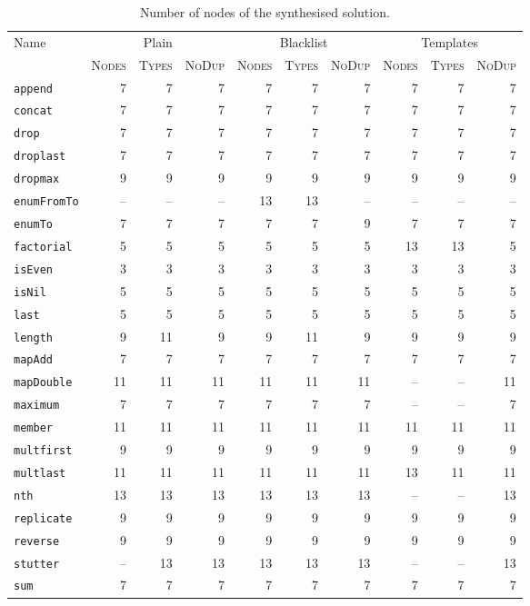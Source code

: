 {\footnotesize
\begin{longtable}{@{}lr@{\hspace{2pt}}r@{\hspace{2pt}}rr@{\hspace{2pt}}r@{\hspace{2pt}}rr@{\hspace{2pt}}r@{\hspace{2pt}}r@{}}
\caption{Number of nodes of the synthesised solution.\label{fig:nofnodestable}}\\
\toprule
Name & \multicolumn{3}{c}{\textsf{Plain}} & \multicolumn{3}{c}{\textsf{Blacklist}} & \multicolumn{3}{c}{\textsf{Templates}} \\
\cmidrule(lr){2-4} \cmidrule(lr){5-7} \cmidrule(l){8-10}
     & \textsc{Nodes} & \textsc{Types} & \textsc{NoDup} & \textsc{Nodes} & \textsc{Types} & \textsc{NoDup} & \textsc{Nodes} & \textsc{Types} & \textsc{NoDup} \\
\midrule
\verb|append| & 7 & 7 & 7 & 7 & 7 & 7 & 7 & 7 & 7 \\
\verb|concat| & 7 & 7 & 7 & 7 & 7 & 7 & 7 & 7 & 7 \\
\verb|drop| & 7 & 7 & 7 & 7 & 7 & 7 & 7 & 7 & 7 \\
\verb|droplast| & 7 & 7 & 7 & 7 & 7 & 7 & 7 & 7 & 7 \\
\verb|dropmax| & 9 & 9 & 9 & 9 & 9 & 9 & 9 & 9 & 9 \\
\verb|enumFromTo| & -- & -- & -- & 13 & 13 & -- & -- & -- & -- \\
\verb|enumTo| & 7 & 7 & 7 & 7 & 7 & 9 & 7 & 7 & 7 \\
\lstinline|factorial| & 5 & 5 & 5 & 5 & 5 & 5 & 13 & 13 & 5 \\
\lstinline|isEven| & 3 & 3 & 3 & 3 & 3 & 3 & 3 & 3 & 3 \\
\lstinline|isNil| & 5 & 5 & 5 & 5 & 5 & 5 & 5 & 5 & 5 \\
\lstinline|last| & 5 & 5 & 5 & 5 & 5 & 5 & 5 & 5 & 5 \\
\lstinline|length| & 9 & 11 & 9 & 9 & 11 & 9 & 9 & 9 & 9 \\
\lstinline|mapAdd| & 7 & 7 & 7 & 7 & 7 & 7 & 7 & 7 & 7 \\
\lstinline|mapDouble| & 11 & 11 & 11 & 11 & 11 & 11 & -- & -- & 11 \\
\lstinline|maximum| & 7 & 7 & 7 & 7 & 7 & 7 & -- & -- & 7 \\
\lstinline|member| & 11 & 11 & 11 & 11 & 11 & 11 & 11 & 11 & 11 \\
\lstinline|multfirst| & 9 & 9 & 9 & 9 & 9 & 9 & 9 & 9 & 9 \\
\lstinline|multlast| & 11 & 11 & 11 & 11 & 11 & 11 & 13 & 11 & 11 \\
\lstinline|nth| & 13 & 13 & 13 & 13 & 13 & 13 & -- & -- & 13 \\
\lstinline|replicate| & 9 & 9 & 9 & 9 & 9 & 9 & 9 & 9 & 9 \\
\lstinline|reverse| & 9 & 9 & 9 & 9 & 9 & 9 & 9 & 9 & 9 \\
\lstinline|stutter| & -- & 13 & 13 & 13 & 13 & 13 & -- & -- & 13 \\
\lstinline|sum| & 7 & 7 & 7 & 7 & 7 & 7 & 7 & 7 & 7 \\
\bottomrule
\end{longtable}}

